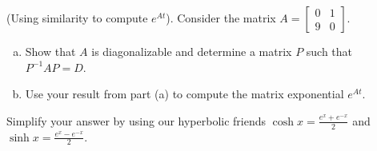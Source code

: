 \documentclass[11pt,letterpaper,boxed]{pset}
\begin{document}
    \begin{problem} [Exercise 8.]
        (Using similarity to compute $e^{At}$). Consider the matrix 
        $ A = \begin{bmatrix} 0 & 1  \\ 9 & 0 \end{bmatrix}. $ 
        
        \begin{enumerate} [(a)]
            \item Show that $A$ is diagonalizable and determine a matrix $P$ such that $P^{-1} A P = D$.
            \item Use your result from part (a) to compute the matrix exponential $e^{At}$.
        \end{enumerate}
        
        Simplify your answer by using our hyperbolic friends $\cosh x = \frac{e^x + e^{-x}}{2}$ and $\sinh x = \frac{e^x - e^{-x}}{2}$.
    \end{problem}
    \newpage
\end{document}
